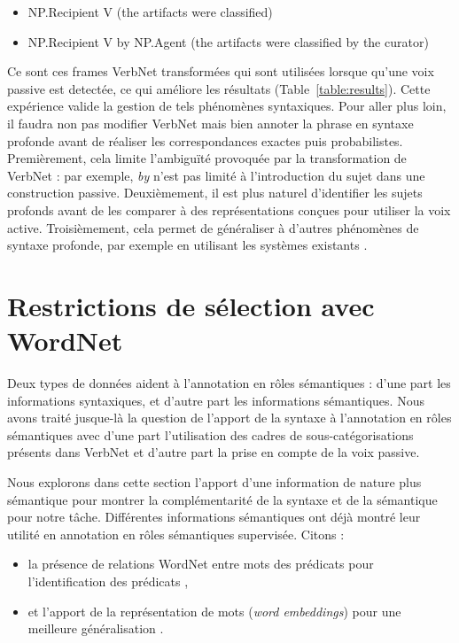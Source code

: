\begin{itemize}
    \item NP.Recipient V (the artifacts were classified)
    \item NP.Recipient V by NP.Agent (the artifacts were classified by the curator)
\end{itemize}

Ce sont ces frames VerbNet transformées qui sont utilisées lorsque qu'une voix
passive est detectée, ce qui améliore les résultats
(Table~\ref{table:results}). Cette expérience valide la gestion de tels
phénomènes syntaxiques. Pour aller plus loin, il faudra non pas modifier
VerbNet mais bien annoter la phrase en syntaxe profonde avant de réaliser les
correspondances exactes puis probabilistes. Premièrement, cela limite
l'ambiguïté provoquée par la transformation de VerbNet : par exemple, \textit{by}
n'est pas limité à l'introduction du sujet dans une construction passive.
Deuxièmement, il est plus naturel d'identifier les sujets profonds avant de les
comparer à des représentations conçues pour utiliser la voix active.
Troisièmement, cela permet de généraliser à d'autres phénomènes de syntaxe
profonde, par exemple en utilisant les systèmes existants
\citep{bonfante2011modular,ribeyre2013systeme}.

\section{Restrictions de sélection avec WordNet}
\label{restrictions_selection}

Deux types de données aident à l'annotation en rôles sémantiques : d'une part
les informations syntaxiques, et d'autre part les informations sémantiques.
Nous avons traité jusque-là la question de l'apport de la syntaxe à
l'annotation en rôles sémantiques avec d'une part l'utilisation des cadres de
sous-catégorisations présents dans VerbNet et d'autre part la prise en compte
de la voix passive.

Nous explorons dans cette section l'apport d'une information de nature plus
sémantique pour montrer la complémentarité de la syntaxe et de la sémantique
pour notre tâche. Différentes informations sémantiques ont déjà montré leur
utilité en annotation en rôles sémantiques supervisée. Citons :

\begin{itemize}
    \item la présence de relations WordNet entre mots des prédicats pour
        l'identification des prédicats \citep{das2010probabilistic},
    \item et l'apport de la représentation de mots (\textit{word embeddings})
        pour une meilleure généralisation \citep{lechelle2014utilisation}.
\end{itemize}

